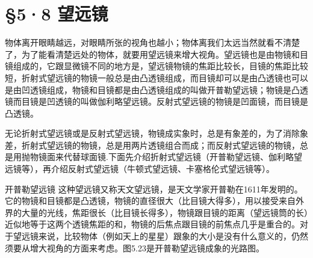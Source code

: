 \section{§5·8 望远镜}

物体离开眼睛越远，对眼睛所张的视角也越小；物体离我们太远当然就看不清楚了，为了能看清楚远处的物体，就要用望远镜来增大视角。望远镜也是由物镜和目镜组成的，它跟显微镜不同的地方是，望远镜物镜的焦距比较长，目镜的焦距比较短，折射式望远镜的物镜一般总是由凸透镜组成，而目镜却可以是由凸透镜也可以是由凹透镜组成，物镜和目镜都是由凸透镜组成的叫做开普勒望远镜；物镜是凸透镜而目镜是凹透镜的叫做伽利略望远镜。反射式望远镜的物镜是凹面镜，而目镜是凸透镜。

无论折射式望远镜或是反射式望远镜，物镜成实象时，总是有象差的，为了消除象差，折射式望远镜的物镜，总是用两片透镜组合而成；而反射式望远镜的物镜，总是用抛物镜面来代替球面镜.下面先介绍折射式望远镜（开普勒望远镜、伽利略望远镜等），再介绍反射式望远镜（牛顿式望远镜、卡塞格伦式望远镜等）。

开普勒望远镜
这种望远镜又称天文望远镜，是天文学家开普勒在1611年发明的。它的物镜和目镜都是凸透镜，物镜的直径很大（比目镜大得多），用以接受来自外界的大量的光线，焦距很长（比目镜长得多），物镜跟目镜的距离（望远镜筒的长）近似地等于这两个透镜焦距的和，物镜的后焦点跟目镜的前焦点几乎是重合的。对于望远镜来说，比较物体（例如天上的星星）跟象的大小是没有什么意义的，仍然须要从增大视角的方面来考虑。图5.23是开普勒望远镜成象的光路图。

